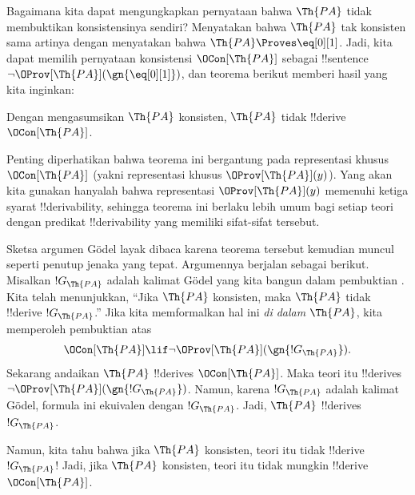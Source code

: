 \documentclass[../../../include/open-logic-section]{subfiles}
\begin{document}


Bagaimana kita dapat mengungkapkan pernyataan bahwa $\Th{PA}$ tidak
membuktikan konsistensinya sendiri? Menyatakan bahwa $\Th{PA}$ tak konsisten
sama artinya dengan menyatakan bahwa $\Th{PA} \Proves \eq[0][1]$. Jadi,
kita dapat memilih pernyataan konsistensi $\OCon[\Th{PA}]$ sebagai
!!{sentence} $\lnot \OProv[\Th{PA}](\gn{\eq[0][1]})$, dan teorema berikut
memberi hasil yang kita inginkan:

\begin{thm}
Dengan mengasumsikan $\Th{PA}$ konsisten, $\Th{PA}$ tidak !!{derive}
$\OCon[\Th{PA}]$.
\end{thm}

Penting diperhatikan bahwa teorema ini bergantung pada representasi khusus
$\OCon[\Th{PA}]$ (yakni representasi khusus $\OProv[\Th{PA}](y)$). Yang
akan kita gunakan hanyalah bahwa representasi $\OProv[\Th{PA}](y)$ memenuhi
ketiga syarat !!{derivability}, sehingga teorema ini berlaku lebih umum bagi
setiap teori dengan predikat !!{derivability} yang memiliki sifat-sifat
tersebut.

Sketsa argumen G\"odel layak dibaca karena teorema tersebut kemudian muncul
seperti penutup jenaka yang tepat. Argumennya berjalan sebagai berikut.
Misalkan $!G_\Th{PA}$ adalah kalimat G\"odel yang kita bangun dalam
pembuktian . Kita telah menunjukkan,
``Jika $\Th{PA}$ konsisten, maka $\Th{PA}$ tidak !!{derive}
$!G_\Th{PA}$.'' Jika kita memformalkan hal ini \emph{di dalam} $\Th{PA}$,
kita memperoleh pembuktian atas
\[
\OCon[\Th{PA}] \lif \lnot \OProv[\Th{PA}](\gn{!G_\Th{PA}}).
\]
Sekarang andaikan $\Th{PA}$ !!{derive}s $\OCon[\Th{PA}]$. Maka teori itu
!!{derive}s $\lnot \OProv[\Th{PA}](\gn{!G_\Th{PA}})$. Namun, karena
$!G_\Th{PA}$ adalah kalimat G\"odel, formula ini ekuivalen dengan
$!G_\Th{PA}$. Jadi, $\Th{PA}$ !!{derive}s $!G_\Th{PA}$.

Namun, kita tahu bahwa jika $\Th{PA}$ konsisten, teori itu tidak !!{derive}
$!G_\Th{PA}$!{} Jadi, jika $\Th{PA}$ konsisten, teori itu tidak mungkin
!!{derive} $\OCon[\Th{PA}]$.
\end{document}
